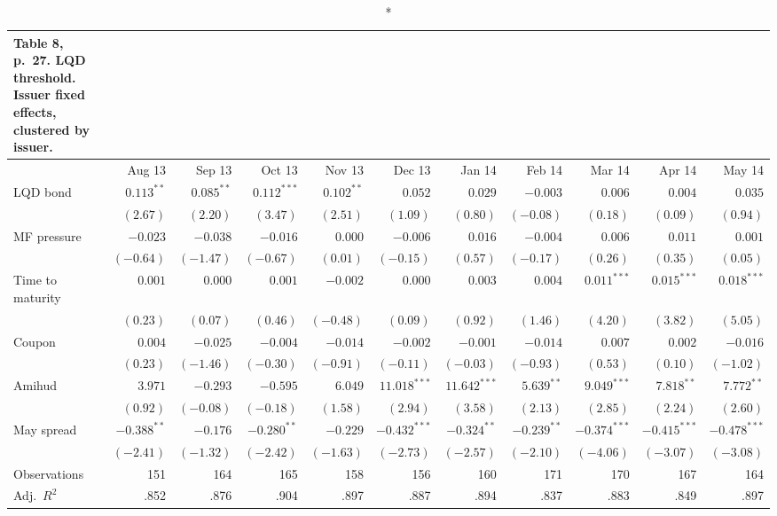 \documentclass[10pt,a4paper]{article}
\begin{document}
\newpage
{\scriptsize\setlength{\tabcolsep}{2pt}
\begin{longtable}{@{}l*{10}{r}@{}}
\caption*{\textbf{Table 8, p.~27. LQD threshold. Issuer fixed effects, clustered by issuer.}}\\
\toprule
 & Aug 13 & Sep 13 & Oct 13 & Nov 13 & Dec 13 & Jan 14 & Feb 14 & Mar 14 & Apr 14 & May 14\\
\midrule\endhead
LQD bond & $0.113^{**}$ & $0.085^{**}$ & $0.112^{***}$ & $0.102^{**}$ & $0.052$ & $0.029$ & $-0.003$ & $0.006$ & $0.004$ & $0.035$\\
 & $(2.67)$ & $(2.20)$ & $(3.47)$ & $(2.51)$ & $(1.09)$ & $(0.80)$ & $(-0.08)$ & $(0.18)$ & $(0.09)$ & $(0.94)$\\
MF pressure & $-0.023$ & $-0.038$ & $-0.016$ & $0.000$ & $-0.006$ & $0.016$ & $-0.004$ & $0.006$ & $0.011$ & $0.001$\\
 & $(-0.64)$ & $(-1.47)$ & $(-0.67)$ & $(0.01)$ & $(-0.15)$ & $(0.57)$ & $(-0.17)$ & $(0.26)$ & $(0.35)$ & $(0.05)$\\
Time to maturity & $0.001$ & $0.000$ & $0.001$ & $-0.002$ & $0.000$ & $0.003$ & $0.004$ & $0.011^{***}$ & $0.015^{***}$ & $0.018^{***}$\\
 & $(0.23)$ & $(0.07)$ & $(0.46)$ & $(-0.48)$ & $(0.09)$ & $(0.92)$ & $(1.46)$ & $(4.20)$ & $(3.82)$ & $(5.05)$\\
Coupon & $0.004$ & $-0.025$ & $-0.004$ & $-0.014$ & $-0.002$ & $-0.001$ & $-0.014$ & $0.007$ & $0.002$ & $-0.016$\\
 & $(0.23)$ & $(-1.46)$ & $(-0.30)$ & $(-0.91)$ & $(-0.11)$ & $(-0.03)$ & $(-0.93)$ & $(0.53)$ & $(0.10)$ & $(-1.02)$\\
Amihud & $3.971$ & $-0.293$ & $-0.595$ & $6.049$ & $11.018^{***}$ & $11.642^{***}$ & $5.639^{**}$ & $9.049^{***}$ & $7.818^{**}$ & $7.772^{**}$\\
 & $(0.92)$ & $(-0.08)$ & $(-0.18)$ & $(1.58)$ & $(2.94)$ & $(3.58)$ & $(2.13)$ & $(2.85)$ & $(2.24)$ & $(2.60)$\\
May spread & $-0.388^{**}$ & $-0.176$ & $-0.280^{**}$ & $-0.229$ & $-0.432^{***}$ & $-0.324^{**}$ & $-0.239^{**}$ & $-0.374^{***}$ & $-0.415^{***}$ & $-0.478^{***}$\\
 & $(-2.41)$ & $(-1.32)$ & $(-2.42)$ & $(-1.63)$ & $(-2.73)$ & $(-2.57)$ & $(-2.10)$ & $(-4.06)$ & $(-3.07)$ & $(-3.08)$\\
Observations & 151 & 164 & 165 & 158 & 156 & 160 & 171 & 170 & 167 & 164\\
Adj.\ $R^2$ & .852 & .876 & .904 & .897 & .887 & .894 & .837 & .883 & .849 & .897\\
\bottomrule
\end{longtable}}
\end{document}
